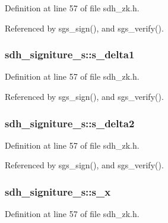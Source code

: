Definition at line 57 of file sdh\-\_\-zk.\-h.



Referenced by sgs\-\_\-sign(), and sgs\-\_\-verify().

\hypertarget{structsdh__signiture__s_a99bc3d658582a834173aa97a9a5989ba}{
\subsubsection[{s\-\_\-delta1}]{ sdh\-\_\-signiture\-\_\-s\-::s\-\_\-delta1}}\label{structsdh__signiture__s_a99bc3d658582a834173aa97a9a5989ba}


Definition at line 57 of file sdh\-\_\-zk.\-h.



Referenced by sgs\-\_\-sign(), and sgs\-\_\-verify().

\hypertarget{structsdh__signiture__s_aee44aef0906dddc0a503ca02896a1e3a}{
\subsubsection[{s\-\_\-delta2}]{ sdh\-\_\-signiture\-\_\-s\-::s\-\_\-delta2}}\label{structsdh__signiture__s_aee44aef0906dddc0a503ca02896a1e3a}


Definition at line 57 of file sdh\-\_\-zk.\-h.



Referenced by sgs\-\_\-sign(), and sgs\-\_\-verify().

\hypertarget{structsdh__signiture__s_a5f0af1c84479728b17ac0cab39f6e587}{
\subsubsection[{s\-\_\-x}]{ sdh\-\_\-signiture\-\_\-s\-::s\-\_\-x}}\label{structsdh__signiture__s_a5f0af1c84479728b17ac0cab39f6e587}


Definition at line 57 of file sdh\-\_\-zk.\-h.



